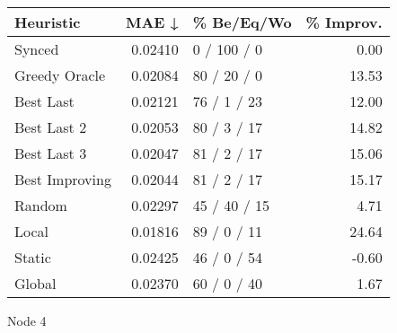 \begin{tabular}{lrlr}
\toprule
\textbf{Heuristic} & \textbf{MAE ↓} & \textbf{\% Be/Eq/Wo} & \textbf{\% Improv.} \\
\midrule
            Synced &        0.02410 &          0 / 100 / 0 &                0.00 \\
     Greedy Oracle &        0.02084 &          80 / 20 / 0 &               13.53 \\
         Best Last &        0.02121 &          76 / 1 / 23 &               12.00 \\
       Best Last 2 &        0.02053 &          80 / 3 / 17 &               14.82 \\
       Best Last 3 &        0.02047 &          81 / 2 / 17 &               15.06 \\
    Best Improving &        0.02044 &          81 / 2 / 17 &               15.17 \\
            Random &        0.02297 &         45 / 40 / 15 &                4.71 \\
             Local &        0.01816 &          89 / 0 / 11 &               24.64 \\
            Static &        0.02425 &          46 / 0 / 54 &               -0.60 \\
            Global &        0.02370 &          60 / 0 / 40 &                1.67 \\
\bottomrule
\end{tabular}
\caption{Node 4}
\label{tab:non_lr01_le2_bs4_4}
